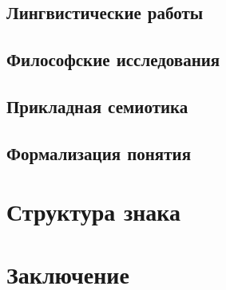 \documentclass[a4paper,12pt]{article}
\begin{document}
	
	\subsection{Лингвистические работы}
	
	\subsection{Философские исследования}
	
	\subsection{Прикладная семиотика}
	
	\subsection{Формализация понятия}
	
	\section{Структура знака}
	\section*{Заключение}
	
   \printbibliography
\end{document}
